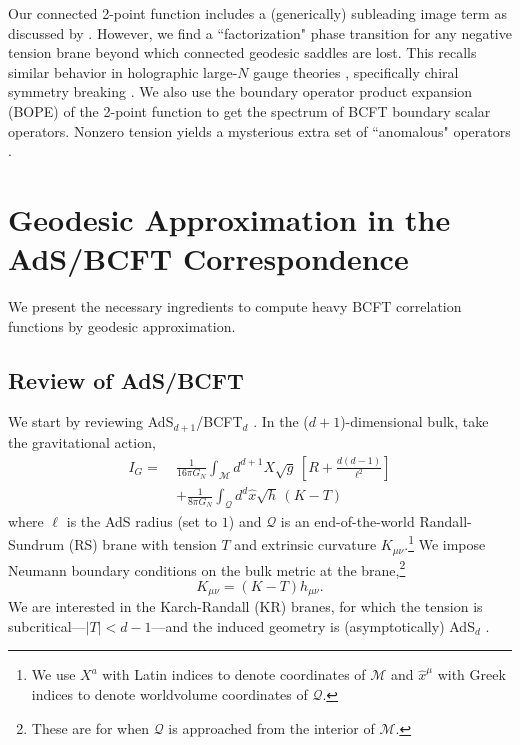 \documentclass[reprint,amsmath,amssymb,aps,nofootinbib,twocolumn]{revtex4-2}
\begin{document}
Our connected 2-point function includes a (generically) subleading image term as discussed by \cite{Almheiri:2018ijj}. However, we find a ``factorization" phase transition for any negative tension brane beyond which connected geodesic saddles are lost. This recalls similar behavior in holographic large-$N$ gauge theories \cite{Witten:1998zw,Brandhuber:1998bs}, specifically chiral symmetry breaking \cite{Albash:2006bs,Johnson:2008vna}. We also use the boundary operator product expansion (BOPE) \cite{McAvity:1995zd,Karch:2017fuh} of the 2-point function to get the spectrum of BCFT boundary scalar operators. Nonzero tension yields a mysterious extra set of ``anomalous" operators \cite{Karch:2017fuh}.

\section{Geodesic Approximation in the A{\lowercase{d}}S/BCFT Correspondence}

We present the necessary ingredients to compute heavy BCFT correlation functions by geodesic approximation.

\subsection{Review of AdS/BCFT}

We start by reviewing AdS$_{d+1}$/BCFT$_d$ \cite{Takayanagi:2011zk,Fujita:2011fp}. In the ($d+1$)-dimensional bulk, take the gravitational action,
\begin{equation}
\begin{split}
I_G =\ & \frac{1}{16 \pi G_N} \int_{\mathcal{M}} d^{d+1}X\sqrt{g}\,\left[R + \frac{d(d-1)}{\ell^2}\right]\\
&+ \frac{1}{8\pi G_N}\int_{\mathcal{Q}} d^d \hat{x}\sqrt{h}\,(K-T)
\end{split}
\end{equation}
where $\ell$ is the AdS radius (set to $1$) and $\mathcal{Q}$ is an end-of-the-world Randall-Sundrum (RS) brane \cite{Randall:1999vf} with tension $T$ and extrinsic curvature $K_{\mu\nu}$.\footnote{We use $ X^{a} $ with Latin indices to denote coordinates of $ \mathcal{M} $ and $ \hat{x}^{\mu} $ with Greek indices to denote worldvolume coordinates of $ \mathcal{Q} $.} We impose Neumann boundary conditions on the bulk metric at the brane,\footnote{These are for when $ \mathcal{Q} $ is approached from the interior of $ \mathcal{M} $.}
\begin{equation}
K_{\mu\nu} = (K-T)h_{\mu\nu}.\label{krNeumann}
\end{equation}
We are interested in the Karch-Randall (KR) branes, for which the tension is subcritical---$|T| < d-1$---and the induced geometry is (asymptotically) AdS$_d$ \cite{Karch:2000ct,Karch:2000gx}.
\end{document}
